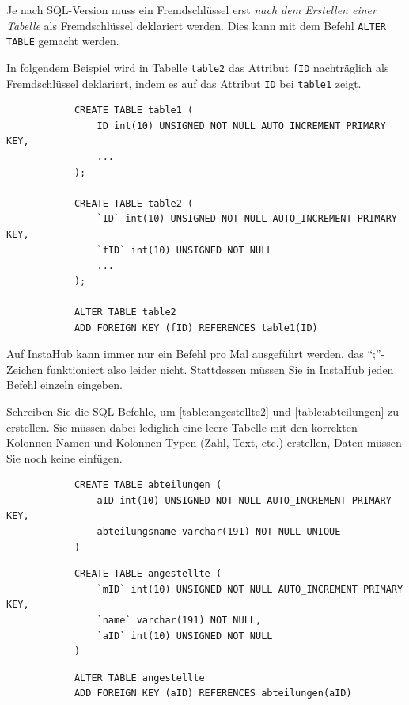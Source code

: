 \begin{mycaution}
	Je nach SQL-Version muss ein Fremdschlüssel erst \textit{nach dem Erstellen einer Tabelle} als Fremdschlüssel deklariert werden. Dies kann mit dem Befehl \lstinline|ALTER TABLE| gemacht werden.
	\begin{myexample}
		In folgendem Beispiel wird in Tabelle \lstinline|table2| das Attribut \lstinline|fID| nachträglich als Fremdschlüssel deklariert, indem es auf das Attribut \lstinline|ID| bei \lstinline|table1| zeigt.
		\begin{lstlisting}
			CREATE TABLE table1 (
				ID int(10) UNSIGNED NOT NULL AUTO_INCREMENT PRIMARY KEY,
				...
			);

			CREATE TABLE table2 (
				`ID` int(10) UNSIGNED NOT NULL AUTO_INCREMENT PRIMARY KEY,
				`fID` int(10) UNSIGNED NOT NULL
				...
			);

			ALTER TABLE table2
			ADD FOREIGN KEY (fID) REFERENCES table1(ID)
		\end{lstlisting}
	\end{myexample}
\end{mycaution}

	\begin{mycaution}
Auf InstaHub kann immer nur ein Befehl pro Mal ausgeführt werden, das \enquote{;}-Zeichen funktioniert also leider nicht. Stattdessen müssen Sie in InstaHub jeden Befehl einzeln eingeben.
	\end{mycaution}

\begin{myexercise}
	Schreiben Sie die SQL-Befehle, um \cref{table:angestellte2} und \cref{table:abteilungen} zu erstellen. Sie müssen dabei lediglich eine leere Tabelle mit den korrekten Kolonnen-Namen und Kolonnen-Typen (Zahl, Text, etc.) erstellen, Daten müssen Sie noch keine einfügen.
	\begin{myanswer}
		\begin{lstlisting}
			CREATE TABLE abteilungen (
				aID int(10) UNSIGNED NOT NULL AUTO_INCREMENT PRIMARY KEY,
				abteilungsname varchar(191) NOT NULL UNIQUE
			)
			\end{lstlisting}
			\begin{lstlisting}
			CREATE TABLE angestellte (
				`mID` int(10) UNSIGNED NOT NULL AUTO_INCREMENT PRIMARY KEY,
				`name` varchar(191) NOT NULL,
				`aID` int(10) UNSIGNED NOT NULL
			)
			\end{lstlisting}
		\begin{lstlisting}
			ALTER TABLE angestellte
			ADD FOREIGN KEY (aID) REFERENCES abteilungen(aID)
		\end{lstlisting}
	\end{myanswer}
\end{myexercise}

